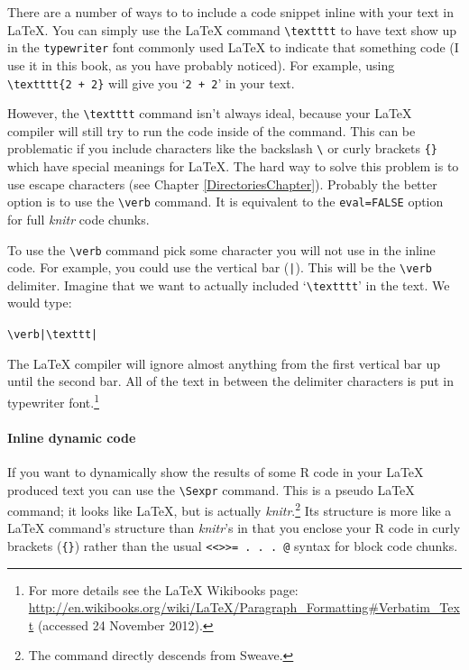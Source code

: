 {There are a number of ways to to include a code snippet inline with your text in LaTeX. You can simply use the LaTeX command \verb|\textttt| to have text show up in the \texttt{typewriter} font commonly used LaTeX to indicate that something code (I use it in this book, as you have probably noticed). For example, using \verb|\textttt{2 + 2}| will give you `\texttt{2 + 2}' in your text.

However, the \verb|\textttt| command isn't always ideal, because your LaTeX compiler will still try to run the code inside of the command. This can be problematic if you include characters like the backslash \verb|\| or curly brackets \verb|{}| which have special meanings for LaTeX. The hard way to solve this problem is to use escape characters (see Chapter \ref{DirectoriesChapter}). Probably the better option is to use the \verb|\verb| command. It is equivalent to the \texttt{eval=FALSE} option for full {\emph{knitr}} code chunks. 

To use the \verb|\verb| command pick some character you will not use in the inline code. For example, you could use the vertical bar (\texttt{|}). This will be the \verb|\verb| delimiter. Imagine that we want to actually included `\verb|\textttt|' in the text. We would type:

\begin{knitrout}
\color{fgcolor}\begin{kframe}
\begin{alltt}
\textbackslash{}verb|\textbackslash{}texttt|
\end{alltt}
\end{kframe}
\end{knitrout}


\noindent The LaTeX compiler will ignore almost anything from the first vertical bar up until the second bar. All of the text in between the delimiter characters is put in typewriter font.\footnote{For more details see the LaTeX Wikibooks page: \url{http://en.wikibooks.org/wiki/LaTeX/Paragraph_Formatting#Verbatim_Text} (accessed 24 November 2012).}

\paragraph{Inline dynamic code}

If you want to dynamically show the results of some R code in your LaTeX produced text you can use the  \texttt{\textbackslash Sexpr} command. This is a pseudo LaTeX command; it looks like LaTeX, but is actually {\emph{knitr}}.\footnote{The command directly descends from Sweave.} Its structure is more like a LaTeX command's structure than {\emph{knitr}}'s in that you enclose your R code in curly brackets (\texttt{\{\}}) rather than the usual \verb|<<>>= . . . @| syntax for block code chunks. 

}
